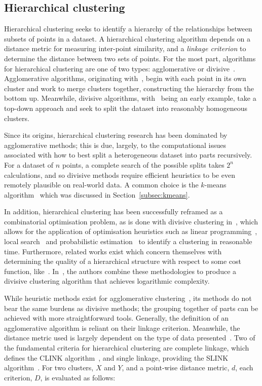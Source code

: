 \subsection{Hierarchical clustering}

Hierarchical clustering seeks to identify a hierarchy of the relationships
between subsets of points in a dataset. A hierarchical clustering algorithm
depends on a distance metric for measuring inter-point similarity, and a
\emph{linkage criterion} to determine the distance between two sets of points.
For the most part, algorithms for hierarchical clustering are one of two types:
agglomerative or divisive~\cite{Kaufman1990}. Agglomerative algorithms,
originating with~\cite{Johnson1967,Ward1963}, begin with each point in its own
cluster and work to merge clusters together, constructing the hierarchy from the
bottom up. Meanwhile, divisive algorithms, with~\cite{Edwards1965} being an
early example, take a top-down approach and seek to split the dataset into
reasonably homogeneous clusters.

Since its origins, hierarchical clustering research has been dominated by
agglomerative methods; this is due, largely, to the computational issues
associated with how to best split a heterogeneous dataset into parts
recursively. For a dataset of \(n\) points, a complete search of the possible
splits takes \(2^n\) calculations, and so divisive methods require efficient
heuristics to be even remotely plausible on real-world data. A common choice is
the \(k\)-means algorithm~\cite{Moseley2017,Peterson2018} which was discussed in
Section~\ref{subsec:kmeans}.

In addition, hierarchical clustering has been successfully reframed as a
combinatorial optimisation problem, as is done with divisive clustering
in~\cite{Dasgupta2016}, which allows for the application of optimisation
heuristics such as linear programming~\cite{Roy2017}, local
search~\cite{Aljarah2019} and probabilistic estimation~\cite{Fan2015} to
identify a clustering in reasonable time. Furthermore, related works exist which
concern themselves with determining the quality of a hierarchical structure with
respect to some cost function, like~\cite{Bilu2012,Lyzinski2017}.
In~\cite{CohenAddad2018}, the authors combine these methodologies to produce a
divisive clustering algorithm that achieves logarithmic complexity.

While heuristic methods exist for agglomerative
clustering~\cite{Aljarah2019,Fan2015}, its methods do not bear the same burdens
as divisive methods; the grouping together of parts can be achieved with more
straightforward tools. Generally, the definition of an agglomerative
algorithm is reliant on their linkage criterion. Meanwhile, the
distance metric used is largely dependent on the type of data
presented~\cite{Nielsen2016}. Two of the fundamental criteria for hierarchical
clustering are complete linkage, which defines the CLINK
algorithm~\cite{Defays1977}, and single linkage, providing the SLINK
algorithm~\cite{Sibson1973}. For two clusters, \(X\) and \(Y\), and a point-wise
distance metric, \(d\), each criterion, \(D\), is evaluated as follows:

